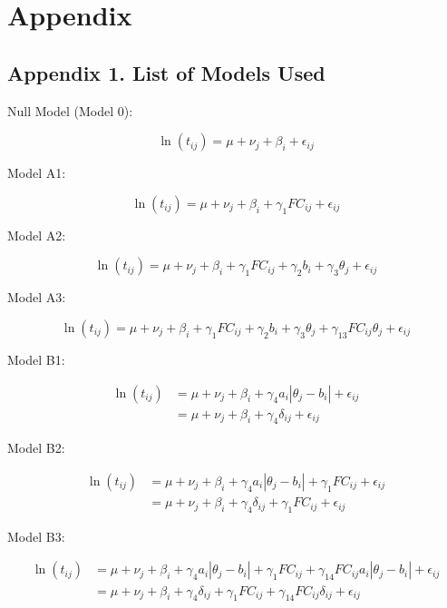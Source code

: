 \documentclass[
  number]{elsarticle}
\begin{document}
\section*{Appendix}\label{appendix}

\subsection*{Appendix 1. List of Models
Used}\label{appendix-1.-list-of-models-used}

Null Model (Model 0):

\[
\ln{(t_{ij})} = \mu + \nu_j + \beta_i + \epsilon_{ij}
\]

Model A1:

\[
\ln{(t_{ij})} = \mu + \nu_j + \beta_i + \gamma_1 FC_{ij} + \epsilon_{ij}
\]

Model A2:

\[
\ln{(t_{ij})} = \mu + \nu_j + \beta_i + \gamma_1 FC_{ij} + \gamma_2b_i + \gamma_3 \theta_j + \epsilon_{ij}
\]

Model A3:

\[
\ln{(t_{ij})} = \mu + \nu_j + \beta_i + \gamma_1 FC_{ij} + \gamma_2b_i + \gamma_3 \theta_j + \gamma_{13} FC_{ij} \theta_j+ \epsilon_{ij}
\]

Model B1:

\begin{align}
\ln{(t_{ij})} &= \mu + \nu_j + \beta_i + \gamma_4 a_i |\theta_j - b_i|+ \epsilon_{ij} \\
&=\mu + \nu_j +\beta_i +\gamma_4\delta_{ij}+\epsilon_{ij}
\end{align}

Model B2:

\begin{align}
\ln{(t_{ij})} &= \mu + \nu_j + \beta_i + \gamma_4 a_i |\theta_j - b_i|+ \gamma_1FC_{ij}+\epsilon_{ij} \\
&=\mu + \nu_j +\beta_i +\gamma_4\delta_{ij}+\gamma_1 FC_{ij}+\epsilon_{ij}
\end{align}

Model B3:

\begin{align}
\ln{(t_{ij})} &= \mu + \nu_j + \beta_i + \gamma_4 a_i |\theta_j - b_i|+ \gamma_1FC_{ij}+\gamma_{14}FC_{ij}a_i|\theta_j-b_i|+\epsilon_{ij} \\
&=\mu + \nu_j +\beta_i +\gamma_4\delta_{ij}+\gamma_1 FC_{ij}+\gamma_{14}FC_{ij}\delta_{ij}+\epsilon_{ij}
\end{align}
\end{document}

